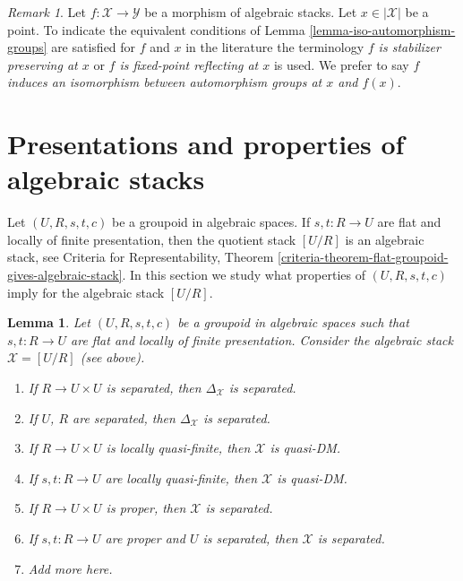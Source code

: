 \documentclass{stacks-project}
\theoremstyle{plain}
\newtheorem{lemma}[subsection]{Lemma}
\theoremstyle{definition}
\theoremstyle{remark}
\newtheorem{remark}[subsection]{Remark}
\numberwithin{equation}{subsection}
\begin{document}
\begin{remark}
\label{remark-identify-automorphism-groups}
Let $f : \mathcal{X} \to \mathcal{Y}$ be a morphism of algebraic stacks.
Let $x \in |\mathcal{X}|$ be a point. To indicate the equivalent
conditions of Lemma \ref{lemma-iso-automorphism-groups}
are satisfied for $f$ and $x$ in the literature the terminology
{\it $f$ is stabilizer preserving at $x$} or
{\it $f$ is fixed-point reflecting at $x$} is used.
We prefer to say {\it $f$ induces an isomorphism between
automorphism groups at $x$ and $f(x)$}.
\end{remark}





\section{Presentations and properties of algebraic stacks}
\label{section-presentations-properties}

\noindent
Let $(U, R, s, t, c)$ be a groupoid in algebraic spaces.
If $s, t : R \to U$ are flat and locally of finite presentation,
then the quotient stack $[U/R]$ is an algebraic stack, see
Criteria for Representability, Theorem
\ref{criteria-theorem-flat-groupoid-gives-algebraic-stack}.
In this section we study what properties of $(U, R, s, t, c)$
imply for the algebraic stack $[U/R]$.

\begin{lemma}
\label{lemma-properties-diagonal-from-presentation}
Let $(U, R, s, t, c)$ be a groupoid in algebraic spaces such that
$s, t : R \to U$ are flat and locally of finite presentation.
Consider the algebraic stack $\mathcal{X} = [U/R]$ (see above).
\begin{enumerate}
\item If $R \to U \times U$ is separated, then
$\Delta_\mathcal{X}$ is separated.
\item If $U$, $R$ are separated, then $\Delta_\mathcal{X}$ is separated.
\item If $R \to U \times U$ is locally quasi-finite, then $\mathcal{X}$
is quasi-DM.
\item If $s, t : R \to U$ are locally quasi-finite, then
$\mathcal{X}$ is quasi-DM.
\item If $R \to U \times U$ is proper, then $\mathcal{X}$ is separated.
\item If $s, t : R \to U$ are proper and $U$ is separated, then
$\mathcal{X}$ is separated.
\item Add more here.
\end{enumerate}
\end{lemma}
\end{document}
